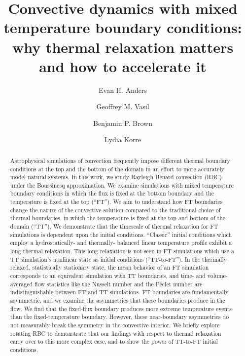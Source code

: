 \documentclass[aps, pre, onecolumn, nofootinbib, notitlepage, groupedaddress, amsfonts, amssymb, amsmath, longbibliography, superscriptaddress]{revtex4-1}
\newcommand{\RB}{Rayleigh-B\'{e}nard }
\begin{document}
\author{Evan H. Anders}
\author{Geoffrey M. Vasil}
\author{Benjamin P. Brown}
\author{Lydia Korre}

\title{Convective dynamics with mixed temperature boundary conditions: \\
why thermal relaxation matters and how to accelerate it}

\begin{abstract}
Astrophysical simulations of convection frequently impose different thermal boundary conditions at the top and the bottom of the domain in an effort to more accurately model natural systems.
In this work, we study \RB convection (RBC) under the Boussinesq approximation.
We examine simulations with mixed temperature boundary conditions in which the flux is fixed at the bottom boundary and the temperature is fixed at the top (``FT'').
We aim to understand how FT boundaries change the nature of the convective solution compared to the traditional choice of thermal boundaries, in which the temperature is fixed at the top and bottom of the domain (``TT'').
We demonstrate that the timescale of thermal relaxation for FT simulations is dependent upon the initial conditions.
``Classic'' initial conditions which employ a hydrostatically- and thermally- balanced linear temperature profile exhibit a long thermal relaxation.
This long relaxation is not seen in FT simulations which use a TT simulation's nonlinear state as initial conditions (``TT-to-FT'').
In the thermally relaxed, statistically stationary state, the mean behavior of an FT simulation corresponds to an equivalent simulation with TT boundaries, and time- and volume-averaged flow statistics like the Nusselt number and the P\'{e}clet number are indistinguishable between FT and TT simulations.
FT boundaries are fundamentally asymmetric, and we examine the asymmetries that these boundaries produce in the flow.
We find that the fixed-flux boundary produces more extreme temperature events than the fixed-temperature boundary.
However, these near-boundary asymmetries do not measurably break the symmetry in the convective interior.
We briefly explore rotating RBC to demonstrate that our findings with respect to thermal relaxation carry over to this more complex case, and to show the power of TT-to-FT initial conditions.
\end{abstract}
\maketitle
\end{document}
